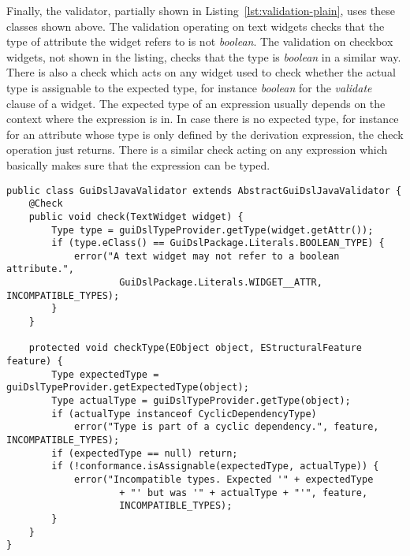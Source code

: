 Finally, the validator, partially shown in Listing~\ref{lst:validation-plain},
uses these classes shown above.  The validation operating on text widgets checks that
the type of attribute the widget refers to is not \emph{boolean}.  The validation on
checkbox widgets, not shown in the listing, checks that the type is
\emph{boolean} in a similar way.
There is also a check which acts on any widget used to check whether the actual
type is assignable to the expected type, for instance \emph{boolean} for the
\emph{validate} clause of a widget. The expected type of an expression usually
depends on the context where the expression is in.
In case there is no expected type, for instance for an attribute whose type is
only defined by the derivation expression, the check operation just returns.
There is a similar check acting on any expression which basically makes sure
that the expression can be typed.

%

\begin{lstlisting}[float=tb,label=lst:validation-plain,caption=Xtext validator.] 
public class GuiDslJavaValidator extends AbstractGuiDslJavaValidator {
	@Check
	public void check(TextWidget widget) {
		Type type = guiDslTypeProvider.getType(widget.getAttr());
		if (type.eClass() == GuiDslPackage.Literals.BOOLEAN_TYPE) {
			error("A text widget may not refer to a boolean attribute.",
					GuiDslPackage.Literals.WIDGET__ATTR, INCOMPATIBLE_TYPES);
		}
	}

	protected void checkType(EObject object, EStructuralFeature feature) {
		Type expectedType = guiDslTypeProvider.getExpectedType(object);
		Type actualType = guiDslTypeProvider.getType(object);
		if (actualType instanceof CyclicDependencyType)
			error("Type is part of a cyclic dependency.", feature, INCOMPATIBLE_TYPES);
		if (expectedType == null) return;
		if (!conformance.isAssignable(expectedType, actualType)) {
			error("Incompatible types. Expected '" + expectedType
					+ "' but was '" + actualType + "'", feature,
					INCOMPATIBLE_TYPES);
		}
	}
}
\end{lstlisting}


%

